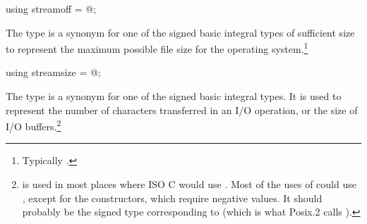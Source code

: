 %
\begin{itemdecl}
using streamoff = @\impdef@;
\end{itemdecl}

\begin{itemdescr}
\pnum
The type  is a synonym for one of the signed basic integral types of
sufficient size to represent the maximum possible file size for the operating system.\footnote{Typically .}
\end{itemdescr}

%
\begin{itemdecl}
using streamsize = @\impdef@;
\end{itemdecl}

\begin{itemdescr}
\pnum
The type
is a synonym for one of the signed basic
integral types.
It is used to represent the number of characters transferred in an I/O
operation, or the size of I/O buffers.\footnote{
is used in most places where ISO C would use
.
Most of the uses of
could use
,
except for the
constructors, which require negative values.
It should probably be the signed type corresponding to
(which is what Posix.2 calls
).}
\end{itemdescr}

